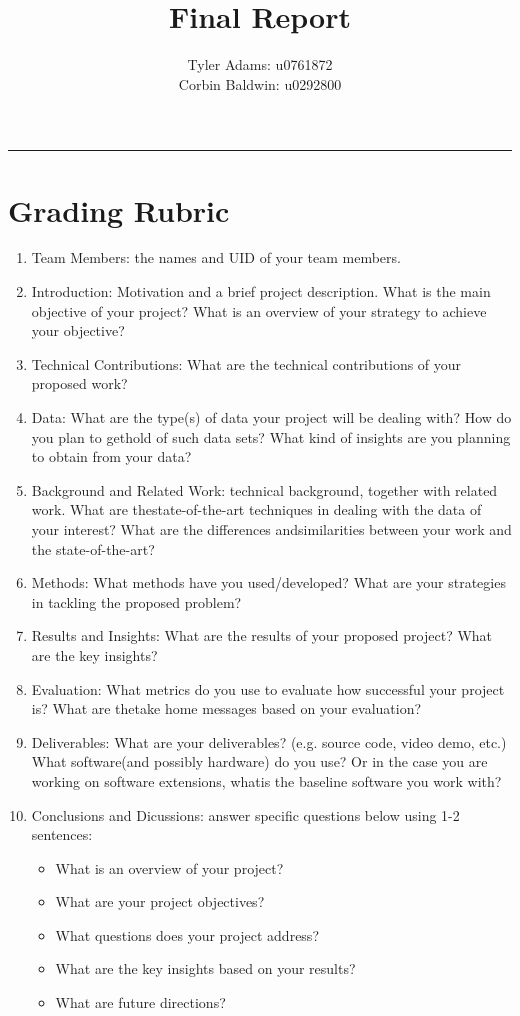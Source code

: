 \documentclass[12pt, fullpage,letterpaper]{article}
\title{Final Report}
\author{Tyler Adams: u0761872 \\Corbin Baldwin: u0292800}
\begin{document}
	\maketitle 
	\hrule 
	\vskip 0.5cm
	\section{Grading Rubric}
	\begin{enumerate}
		\item Team Members:  the names and UID of your team members.
		\item Introduction:  Motivation  and  a  brief  project  description.   What  is  the  main  objective  of  your project?  What is an overview of your strategy to achieve your objective?
		\item Technical Contributions:  What are the technical contributions of your proposed work?
		\item Data:  What are the type(s) of data your project will be dealing with?  How do you plan to gethold of such data sets?  What kind of insights are you planning to obtain from your data?
		\item Background and Related Work:  technical background, together with related work.  What are thestate-of-the-art techniques in dealing with the data of your interest?  What are the differences andsimilarities between your work and the state-of-the-art?
		\item Methods:   What  methods  have  you  used/developed?   What  are  your  strategies  in  tackling  the proposed problem?
		\item Results and Insights:  What are the results of your proposed project?  What are the key insights?
		\item Evaluation:  What metrics do you use to evaluate how successful your project is?  What are thetake home messages based on your evaluation?
		\item Deliverables:  What are your deliverables?  (e.g.  source code,  video demo,  etc.)  What software(and possibly hardware) do you use?  Or in the case you are working on software extensions, whatis the baseline software you work with?
		\item Conclusions and Dicussions:  answer specific questions below using 1-2 sentences:
		\begin{itemize}
			\item What is an overview of your project?
			\item What are your project objectives?
			\item What questions does your project address?
			\item What are the key insights based on your results?
			\item What are future directions?
		\end{itemize}
	\end{enumerate}	
	
\end{document}
